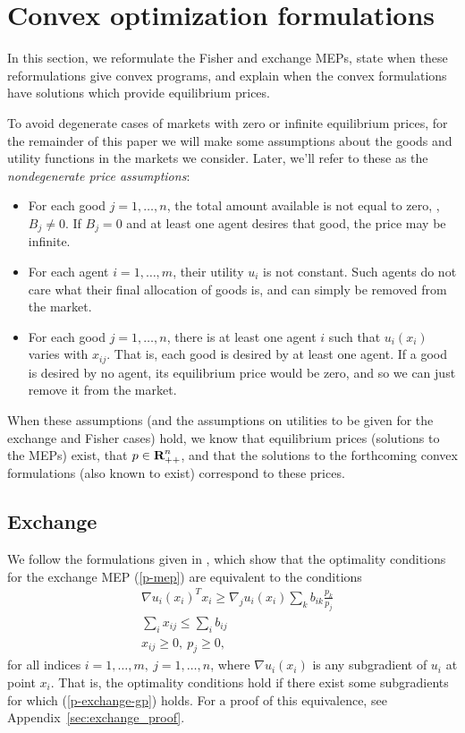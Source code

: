 \documentclass[12pt]{article}
\begin{document}
\section{Convex optimization formulations}
\label{sec:convex_form}
In this section, we reformulate the Fisher and exchange MEPs, state when these
reformulations give convex programs, and explain when the convex formulations
have solutions which provide equilibrium prices.

To avoid degenerate cases of markets with zero or infinite equilibrium prices,
for the remainder of this paper we will make some assumptions about the goods
and utility functions in the markets we consider. Later, we'll refer to
these as the \emph{nondegenerate price assumptions}:
\begin{itemize}
\item For each good $j=1,\ldots,n$, the total amount available is not equal to
zero, \ie,
$
B_j \neq 0.
$
If $B_j = 0$ and at least one agent desires that good, the price may be infinite.
\item For each agent $i=1,\ldots,m$, their utility $u_i$ is not constant.
Such agents do not care what their final allocation of goods is, and can simply
be removed from the market.
\item For each good $j=1,\ldots,n$, there is at least one agent $i$ such
that $u_i(x_i)$ varies with $x_{ij}$. That is, each good is desired by
at least one agent. If a good is desired by no agent, its equilibrium
price would be zero, and so we can just remove it from the market.
\end{itemize}

When these assumptions (and the assumptions on utilities to be given for the
exchange and Fisher cases) hold, we know that equilibrium prices (solutions to
the MEPs) exist, that $p \in {\mbox{\bf R}}^n_{++}$, and that the solutions to the
forthcoming convex formulations (also known to exist) correspond to these
prices.

\subsection{Exchange}
\label{sec:convex_form_exchange}

We follow the formulations given in
\cite{jain2007polynomial, chen2007note, nenakov1983algorithm}, which show that
the optimality conditions for the exchange MEP (\ref{p-mep}) are equivalent to
the conditions
\begin{equation}
\begin{array}{ll}
& \nabla u_i(x_i)^T x_i \geq  \nabla_j u_i(x_i) \sum_k b_{ik} \frac{p_k}{p_j}\\
& \sum_i x_{ij} \leq \sum_i b_{ij}\\
& x_{ij} \geq 0,\ p_j \geq 0,
\end{array}
\label{p-exchange-gp}
\end{equation}
for all indices $i=1,\ldots,m,\ j=1,\ldots,n$, where $\nabla u_i(x_i)$
is any subgradient of $u_i$ at point $x_i$. That is, the optimality
conditions hold if there exist some subgradients for which (\ref{p-exchange-gp})
holds.
For a proof of this equivalence, see Appendix~\ref{sec:exchange_proof}.
\end{document}
